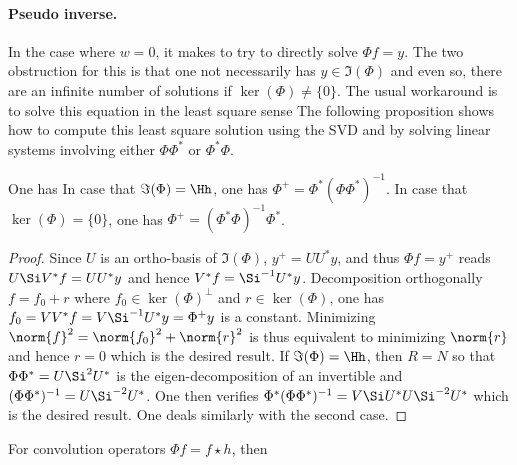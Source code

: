 

\paragraph{Pseudo inverse.}

In the case where $w=0$, it makes to try to directly solve $\Phi f = y$. The two obstruction for this is that one not necessarily has $y \in \Im(\Phi)$ and even so, there are an infinite number of solutions if $\ker(\Phi) \neq \{0\}$. The usual workaround is to solve this equation in the least square sense 
The following proposition shows how to compute this least square solution using the SVD and by solving linear systems involving either $\Phi\Phi^*$ or $\Phi^*\Phi$. 

\begin{prop}\label{prop-pseudo-inv}
	One has
	In case that $\Im(\Phi)=\Hh$, one has $\Phi^+ = \Phi^* (\Phi\Phi^*)^{-1}$.
	In case that $\ker(\Phi)=\{0\}$, one has $\Phi^+ = (\Phi^* \Phi)^{-1} \Phi^*$.
\end{prop}

\begin{proof}
	Since $U$ is an ortho-basis of $\Im(\Phi)$, $y^+=UU^* y$, and thus $\Phi f=y^+$ reads
	$U \Si V^* f = UU^* y$ and hence $V^* f = \Si^{-1} U^* y$. Decomposition orthogonally $f=f_0+r$ where $f_0 \in \ker(\Phi)^\bot$ and $r \in \ker(\Phi)$, one has $f_0=VV^* f = V \Si^{-1} U^* y = \Phi^+ y$ is a constant. Minimizing $\norm{f}^2=\norm{f_0}^2+\norm{r}^2$ is thus equivalent to minimizing $\norm{r}$ and hence $r=0$ which is the desired result.
	If $\Im(\Phi)=\Hh$, then $R=N$ so that $\Phi\Phi^* = U \Si^2 U^*$ is the eigen-decomposition of an invertible and $(\Phi\Phi^*)^{-1} = U \Si^{-2} U^*$.
	One then verifies $\Phi^* (\Phi\Phi^*)^{-1} = V \Si U^* U \Si^{-2} U^*$ which is the desired result.
	One deals similarly with the second case. 
\end{proof}

For convolution operators $\Phi f = f \star h$, then 


